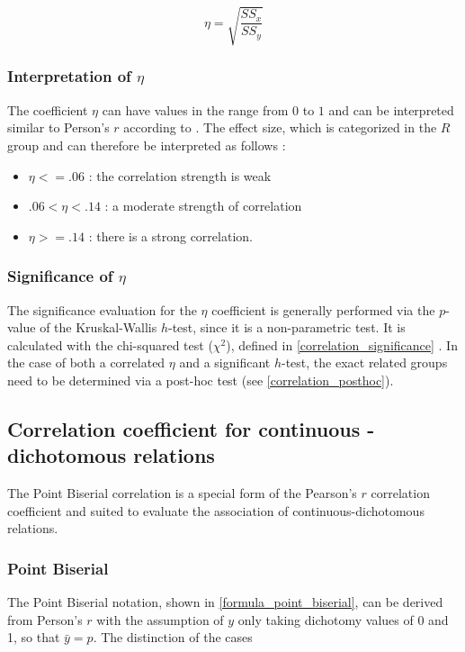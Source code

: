 \smallskip
\begin{equation}
\label{formula_eta}	
	\eta = \sqrt{\frac{SS_x}{SS_y}}
\end{equation}

\subsubsection{Interpretation of $\eta$}
The coefficient $\eta$ can have values in the range from $0$ to $1$ and can be interpreted similar to Person's $r$ according to \parencite{Laken2013}. The effect size, which is categorized in the $R$ group and can therefore be interpreted as follows \parencite{Regber2016,Cohen1988}:
\begin{itemize}
	\item $\eta <= .06$ : the correlation strength is weak
	\item $.06 < \eta < .14$ : a moderate strength of correlation
	\item $\eta >= .14$ : there is a strong correlation.
\end{itemize}

\subsubsection{Significance of $\eta$}
The significance evaluation for the $\eta$ coefficient is generally performed via the $p$-value of the Kruskal-Wallis $h$-test, since it is a non-parametric test. It is calculated with the chi-squared test ($\chi^2$), defined in \cref{correlation_significance} \parencite{Filipiak2013}. In the case of both a correlated $\eta$ and a significant $h$-test, the exact related groups need to be determined via a post-hoc test (see \cref{correlation_posthoc}).

\subsection{Correlation coefficient for continuous - dichotomous relations}
The Point Biserial correlation is a special form of the Pearson's $r$ correlation coefficient and suited to evaluate the association of continuous-dichotomous relations. 

\subsubsection{Point Biserial}
The Point Biserial notation, shown in \cref{formula_point_biserial}, can be derived from Person's $r$ with the assumption of $y$ only taking dichotomy values of 0 and 1, so that $\bar{y} = p$. The distinction of the cases

